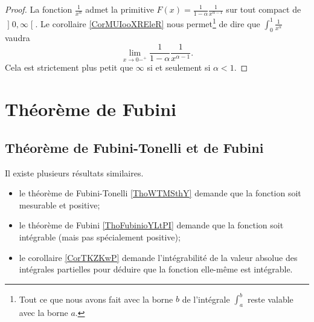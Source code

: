 \begin{proof}
La fonction \( \frac{1}{ x^{\alpha} }\) admet la primitive \( F(x)=\frac{1}{ 1-\alpha }\frac{1}{ x^{\alpha-1} }\) sur tout compact de \( \mathopen] 0 , \infty \mathclose[\). Le corollaire \ref{CorMUIooXREleR} nous permet\footnote{Tout ce que nous avons fait avec la borne \( b\) de l'intégrale \( \int_a^b\) reste valable avec la borne \( a\).} de dire que \( \int_0^1\frac{1}{ x^{\alpha} }\) vaudra
    \begin{equation}
        \lim_{x\to 0-^+} \frac{1}{ 1-\alpha }\frac{1}{ x^{\alpha-1} }.
    \end{equation}
    Cela est strictement plus petit que \( \infty\) si et seulement si \( \alpha<1\).
\end{proof}



\section{Théorème de Fubini}

\subsection{Théorème de Fubini-Tonelli et de Fubini}

Il existe plusieurs résultats similaires. 
\begin{itemize}
    \item
        le théorème de Fubini-Tonelli \ref{ThoWTMSthY} demande que la fonction soit mesurable et positive;
    \item
        le théorème de Fubini \ref{ThoFubinioYLtPI} demande que la fonction soit intégrable (mais pas spécialement positive);
    \item
        le corollaire \ref{CorTKZKwP} demande l'intégrabilité de la valeur absolue des intégrales partielles pour déduire que la fonction elle-même est intégrable.
\end{itemize}


